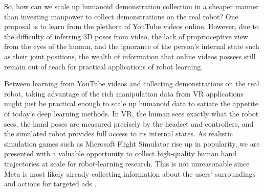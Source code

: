 So, how can we scale up humanoid demonstration collection in a cheaper manner than investing manpower to collect demonstrations on the real robot? 
One proposal is to learn from the plethora of YouTube videos online. However, due to the difficulty of inferring 3D poses from video, the lack of proprioceptive view from the eyes of the human, and the ignorance of the person's internal state such as their joint positions, the wealth of information that online videos possess still remain out of reach for practical applications of robot learning. 

Between learning from YouTube videos and collecting demonstrations on the real robot, taking advantage of the rich manipulation data from VR applications might just be practical enough to scale up humanoid data to satiate the appetite of today's deep learning methods. In VR, the human sees exactly what the robot sees, the hand poses are measured precisely by the headset and controllers, and the simulated robot provides full access to its internal states. As realistic simulation games such as Microsoft Flight Simulator rise up in popularity, we are presented with a valuable opportunity to collect high-quality human hand trajectories at scale for robot-learning research. This is not unreasonable since Meta is most likely already collecting information about the users' surroundings and actions for targeted ads \cite{oculus-privacy}.

